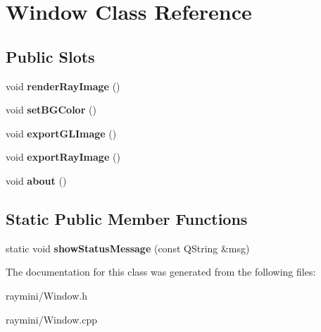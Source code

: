 \hypertarget{class_window}{
\section{Window Class Reference}
\label{class_window}
}
\subsection*{Public Slots}
\begin{DoxyCompactItemize}
\item 
\hypertarget{class_window_a324ff57fb0133df279d95f42b6fba94f}{
void {\bfseries renderRayImage} ()}
\label{class_window_a324ff57fb0133df279d95f42b6fba94f}

\item 
\hypertarget{class_window_accf48a27fa734a601de2193502b5db51}{
void {\bfseries setBGColor} ()}
\label{class_window_accf48a27fa734a601de2193502b5db51}

\item 
\hypertarget{class_window_a486276a193d634bc33ea2e0b105b72b6}{
void {\bfseries exportGLImage} ()}
\label{class_window_a486276a193d634bc33ea2e0b105b72b6}

\item 
\hypertarget{class_window_a1ff6807e4c77f8a943ad4dd6bf5c953f}{
void {\bfseries exportRayImage} ()}
\label{class_window_a1ff6807e4c77f8a943ad4dd6bf5c953f}

\item 
\hypertarget{class_window_a0c39da3e21969b8862f73fd30dd2009c}{
void {\bfseries about} ()}
\label{class_window_a0c39da3e21969b8862f73fd30dd2009c}

\end{DoxyCompactItemize}
\subsection*{Static Public Member Functions}
\begin{DoxyCompactItemize}
\item 
\hypertarget{class_window_a073d51b06af057dd881a7dbe452d3842}{
static void {\bfseries showStatusMessage} (const QString \&msg)}
\label{class_window_a073d51b06af057dd881a7dbe452d3842}

\end{DoxyCompactItemize}


The documentation for this class was generated from the following files:\begin{DoxyCompactItemize}
\item 
raymini/Window.h\item 
raymini/Window.cpp\end{DoxyCompactItemize}
